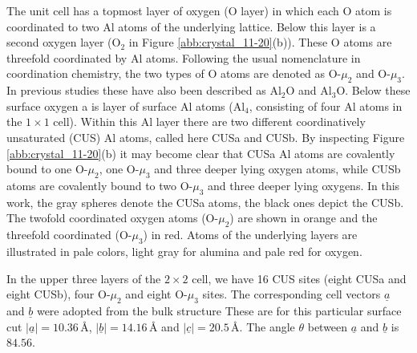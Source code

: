 \documentclass[11pt,DIV=13,BCOR=5mm,a4paper,headinclude]{scrbook}
\renewcommand{\vec}[1]{\underline{#1}}
\begin{document}
The unit cell has a topmost layer of oxygen (O layer) in which each O atom is coordinated to two Al atoms of the underlying lattice.
Below this layer is a second oxygen layer (O$_2$ in Figure \ref{abb:crystal_11-20}(b)).
These O atoms are threefold coordinated by Al atoms.
Following the usual nomenclature in coordination chemistry, the two types of O atoms are denoted as O-$\mu_2$ and O-$\mu_3$.
In previous studies these have also been described as Al$_2$O and Al$_3$O\cite{sung}.
Below these surface oxygen a is layer of surface Al atoms (Al$_4$, consisting of four Al atoms in the $1\times 1$ cell).
Within this Al layer there are two different coordinatively unsaturated (CUS) Al atoms, called here CUSa and CUSb.
By inspecting Figure \ref{abb:crystal_11-20}(b) it may become clear that CUSa Al atoms are covalently bound to one O-$\mu_2$, one O-$\mu_3$ and three deeper lying oxygen atoms, while CUSb atoms are covalently bound to two O-$\mu_3$ and three deeper lying oxygens.
In this work, the gray spheres denote the CUSa atoms, the black ones depict the CUSb.
The twofold coordinated oxygen atoms (O-$\mu_2$) are shown in orange and the threefold coordinated (O-$\mu_3$) in red.
Atoms of the underlying layers are illustrated in pale colors, light gray for alumina and pale red for oxygen.

In the upper three layers of the $2\times 2$ cell, we have 16 CUS sites (eight CUSa and eight CUSb), four O-$\mu_2$ and eight O-$\mu_3$ sites.
The corresponding cell vectors $\vec{a}$ and $\vec{b}$ were adopted from the bulk structure
These are for this particular surface cut $|\vec{a}|=10.36\,$\AA, $|\vec{b}|=14.16\,$\AA{} and $|\vec{c}|=20.5\,$\AA.
The angle $\theta$ between $\vec{a}$ and $\vec{b}$ is $84.56$\textdegree{}.
\end{document}
